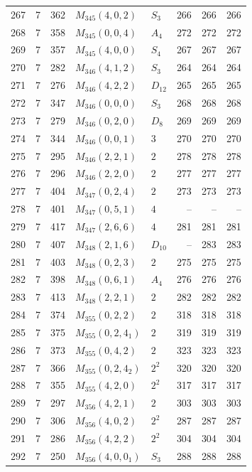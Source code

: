 \documentclass[11pt,a4paper]{article}
\begin{document}
\begin{longtable}{rrr|l|l|rrr}
267 & 7 & 362 & $M_{345}(4,0,2)$ & $S_3$ & 266 & 266 & 266\\
268 & 7 & 358 & $M_{345}(0,0,4)$ & $A_4$ & 272 & 272 & 272\\
269 & 7 & 357 & $M_{345}(4,0,0)$ & $S_4$ & 267 & 267 & 267\\
270 & 7 & 282 & $M_{346}(4,1,2)$ & $S_3$ & 264 & 264 & 264\\
271 & 7 & 276 & $M_{346}(4,2,2)$ & $D_{12}$ & 265 & 265 & 265\\
272 & 7 & 347 & $M_{346}(0,0,0)$ & $S_3$ & 268 & 268 & 268\\
273 & 7 & 279 & $M_{346}(0,2,0)$ & $D_8$ & 269 & 269 & 269\\
274 & 7 & 344 & $M_{346}(0,0,1)$ & $3$ & 270 & 270 & 270\\
275 & 7 & 295 & $M_{346}(2,2,1)$ & $2$ & 278 & 278 & 278\\
276 & 7 & 296 & $M_{346}(2,2,0)$ & $2$ & 277 & 277 & 277\\
277 & 7 & 404 & $M_{347}(0,2,4)$ & $2$ & 273 & 273 & 273\\
278 & 7 & 401 & $M_{347}(0,5,1)$ & $4$ & -- & -- & --\\
279 & 7 & 417 & $M_{347}(2,6,6)$ & $4$ & 281 & 281 & 281\\
280 & 7 & 407 & $M_{348}(2,1,6)$ & $D_{10}$ & -- & 283 & 283\\
281 & 7 & 403 & $M_{348}(0,2,3)$ & $2$ & 275 & 275 & 275\\
282 & 7 & 398 & $M_{348}(0,6,1)$ & $A_4$ & 276 & 276 & 276\\
283 & 7 & 413 & $M_{348}(2,2,1)$ & $2$ & 282 & 282 & 282\\
284 & 7 & 374 & $M_{355}(0,2,2)$ & $2$ & 318 & 318 & 318\\
285 & 7 & 375 & $M_{355}(0,2,4_1)$ & $2$ & 319 & 319 & 319\\
286 & 7 & 373 & $M_{355}(0,4,2)$ & $2$ & 323 & 323 & 323\\
287 & 7 & 366 & $M_{355}(0,2,4_2)$ & $2^2$ & 320 & 320 & 320\\
288 & 7 & 355 & $M_{355}(4,2,0)$ & $2^2$ & 317 & 317 & 317\\
289 & 7 & 297 & $M_{356}(4,2,1)$ & $2$ & 303 & 303 & 303\\
290 & 7 & 306 & $M_{356}(4,0,2)$ & $2^2$ & 287 & 287 & 287\\
291 & 7 & 286 & $M_{356}(4,2,2)$ & $2^2$ & 304 & 304 & 304\\
292 & 7 & 250 & $M_{356}(4,0,0_1)$ & $S_3$ & 288 & 288 & 288\\

\end{longtable}
\end{document}
